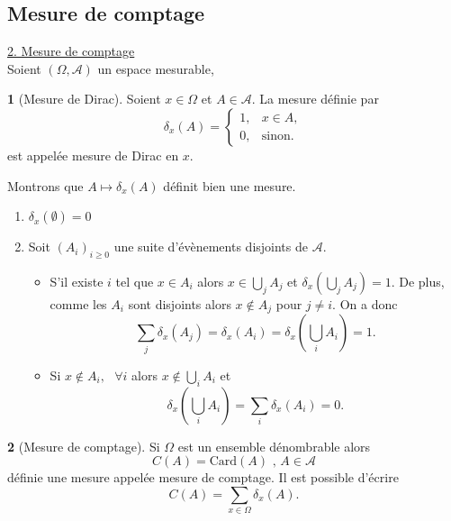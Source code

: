 \documentclass[8pt,notheorems]{beamer}
\theoremstyle{definition}
\newtheorem{definition}{\translate{Definition}}
\theoremstyle{example}
\theoremstyle{mystyle}
\theoremstyle{plain}
\begin{document}
\subsection{Mesure de comptage}
\begin{frame}[allowframebreaks]
\underline{2. Mesure de comptage}\\
Soient $(\Omega, \mathcal{A})$ un espace mesurable,  
\begin{definition}[Mesure de Dirac]
Soient $x\in\Omega$ et $A \in\mathcal{A}$. La mesure définie par 
$$
\delta_x(A)=\begin{cases}
1,&x\in A,\\
0,& \text{sinon.}
\end{cases}
$$
est appelée mesure de Dirac en $x$. 
\end{definition}
Montrons que $A\mapsto \delta_x(A)$ définit bien une mesure. 
\begin{enumerate}
    \item $\delta_x(\emptyset) = 0$
    \item Soit $(A_i)_{i\geq0}$ une suite d'évènements disjoints de $\mathcal{A}$. 
    \begin{itemize}
        \item S'il existe $i$ tel que $x\in A_i$ alors $x\in\bigcup_j A_j$ et $\delta_x\left(\bigcup_j A_j\right)=1$. De plus, comme les $A_i$ sont disjoints alors $ x\notin A_j$ pour $j\neq i$. On a donc 
        $$
        \sum_j\delta_x(A_j) =\delta_x(A_i) = \delta_x\left(\bigcup_i A_i\right) = 1.  
        $$
        \item Si $x\notin A_i,\text{ }\forall i$ alors $x\notin \bigcup_i A_i$ et 
        $$
        \delta_x\left(\bigcup_i A_i\right) = \sum_i\delta_x(A_i) = 0.
        $$  
    \end{itemize}
\end{enumerate}

\begin{definition}[Mesure de comptage]
Si $\Omega$ est un ensemble dénombrable alors
$$
C(A) = \text{Card}(A)\text{ , }A\in\mathcal{A} 
$$
définie une mesure appelée mesure de comptage. Il est possible d'écrire
$$
C(A) = \sum_{x\in\Omega}\delta_x(A). 
$$
\end{definition}
\end{frame}
\end{document}
